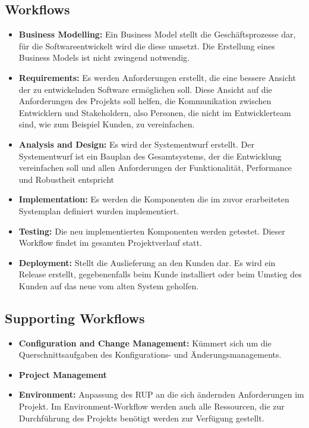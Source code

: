 \subsection{Workflows}
\begin{itemize}
\item \textbf{Business Modelling:} Ein Business Model stellt die Geschäftsprozesse dar, für die Softwareentwickelt wird die diese umsetzt. Die Erstellung eines Business Models ist nicht zwingend notwendig.
\item \textbf{Requirements:} Es werden Anforderungen erstellt, die eine bessere Ansicht der zu entwickelnden Software ermöglichen soll. Diese Ansicht auf die Anforderungen des Projekts soll helfen, die Kommunikation zwischen Entwicklern und Stakeholdern, also Personen, die nicht im Entwicklerteam sind, wie zum Beispiel Kunden, zu vereinfachen.
\item \textbf{Analysis and Design:} Es wird der Systementwurf erstellt. Der Systementwurf ist ein Bauplan des Gesamtsystems, der die Entwicklung vereinfachen soll und allen Anforderungen der Funktionalität, Performance und Robustheit entspricht
\item \textbf{Implementation:} Es werden die Komponenten die im zuvor erarbeiteten Systemplan definiert wurden implementiert.
\item \textbf{Testing:} Die neu implementierten Komponenten werden getestet. Dieser Workflow findet im gesamten Projektverlauf statt.
\item \textbf{Deployment:} Stellt die Auslieferung an den Kunden dar. Es wird ein Release erstellt, gegebenenfalls beim Kunde installiert oder beim Umstieg des Kunden auf das neue vom alten System geholfen.
\end{itemize}
\subsection{Supporting Workflows}
\begin{itemize} 
	\item \textbf{Configuration and Change Management:} Kümmert sich um die Querschnittsaufgaben des Konfigurations- und Änderungsmanagements.
	\item \textbf{Project Management} 
	\item \textbf{Environment:} Anpassung des RUP an die sich ändernden Anforderungen im Projekt. Im Environment-Workflow werden auch alle Ressourcen, die zur Durchführung des Projekts benötigt werden zur Verfügung gestellt.
\end{itemize}
